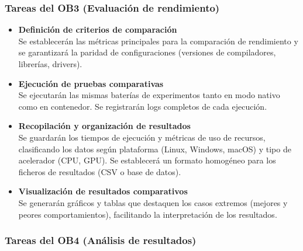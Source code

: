 \subsubsection{Tareas del OB3 (Evaluación de rendimiento)}\label{subsubsec:tareas_ob3}

\begin{itemize}
    \item \textbf{Definición de criterios de comparación} \\
          Se establecerán las métricas principales para la comparación de rendimiento y se garantizará la paridad de configuraciones (versiones de compiladores, librerías, drivers).

    \item \textbf{Ejecución de pruebas comparativas} \\
          Se ejecutarán las mismas baterías de experimentos tanto en modo nativo como en contenedor. Se registrarán logs completos de cada ejecución.

    \item \textbf{Recopilación y organización de resultados} \\
          Se guardarán los tiempos de ejecución y métricas de uso de recursos, clasificando los datos según plataforma (Linux, Windows, macOS) y tipo de acelerador (CPU, GPU). Se establecerá un formato homogéneo para los ficheros de resultados (CSV o base de datos).

    \item \textbf{Visualización de resultados comparativos} \\
          Se generarán gráficos y tablas que destaquen los casos extremos (mejores y peores comportamientos), facilitando la interpretación de los resultados.
\end{itemize}

\subsubsection{Tareas del OB4 (Análisis de resultados)}\label{subsubsec:tareas_ob4}

